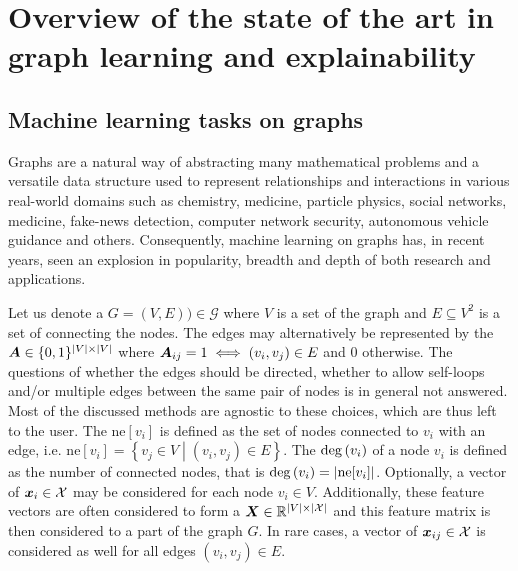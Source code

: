 \chapter{Overview of the state of the art in graph learning and explainability}
\label{chap:sota}

\section{Machine learning tasks on graphs}

Graphs are a natural way of abstracting many mathematical problems and a versatile data structure used to represent relationships and interactions in various real-world domains such as chemistry, medicine, particle physics, social networks, medicine, fake-news detection, computer network security, autonomous vehicle guidance and others. Consequently, machine learning on graphs has, in recent years, seen an explosion in popularity, breadth and depth of both research and applications.

Let us denote a  \( G = \left( V, E \right)) \in \mathcal{G} \) where \( V \) is a set of the graph  and \( E \subseteq V^2 \) is a set of  connecting the nodes. The edges may alternatively be represented by the  \( \bm{A} \in \{ 0, 1 \}^{\left\lvert V \right\rvert \times \left\lvert V \right\rvert} \) where \( \bm{A}_{ij} = 1 \iff \left( v_i, v_j \right) \in E \) and \( 0 \) otherwise. The questions of whether the edges should be directed, whether to allow self-loops and/or multiple edges between the same pair of nodes is in general not answered. Most of the discussed methods are agnostic to these choices, which are thus left to the user. The  \( \mathrm{ne}[ v_i ] \) is defined as the set of nodes connected to \( v_i \) with an edge, i.e. \( \mathrm{ne}[v_i] = \left\{ v_j \in V \middle| \left( v_i, v_j \right) \in E \right\} \). The  \( \mathrm{deg} \left( v_i \right) \) of a node \( v_i \) is defined as the number of connected nodes, that is \( \mathrm{deg} \left( v_i \right) = \left\lvert \mathrm{ne}[v_i] \right\rvert \). Optionally, a vector of  \( \bm{x}_i \in \mathcal{X} \) may be considered for each node \( v_i \in V \). Additionally, these feature vectors are often considered to form a  \( \bm{X} \in \mathbb{R}^{\left\lvert V \right\rvert \times \left\lvert \mathcal{X} \right\rvert} \) and this feature matrix is then considered to a part of the graph \( G \). In rare cases, a vector of  \( \bm{x}_{ij} \in \mathcal{X} \) is considered as well for all edges \( \left( v_i, v_j \right) \in E \).

